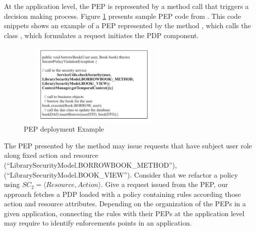 At the application level, the PEP is represented by a method call that triggers a decision making process.
Figure \ref{PEP deployment Example} presents sample PEP code from \cite{legacy}. This code snippets shows an example of a PEP represented by the method , which calls the class 
, which formulates a request initiates the PDP component.

\begin{figure}[!h]
\begin{center}
\includegraphics[width=7.5cm, height=4cm]{PEPExample}
\caption{PEP deployment Example}
\label{PEP deployment Example}
\end{center}
\end{figure}

The PEP presented by the method  may issue requests that have subject user role along fixed action and resource (``LibrarySecurityModel.BORROWBOOK\_METHOD''), (``LibrarySecurityModel.BOOK\_VIEW'').
Consider that we refactor a policy using $SC_{2}=\langle Resource,Action\rangle$.
Give a request issued from the PEP, our approach fetches a PDP loaded with a policy containing rules according those action and resource attributes. Depending on the organization of the PEPs in a given application, connecting the rules with their PEPs at the application level may require to identify enforcements points in an application. 


